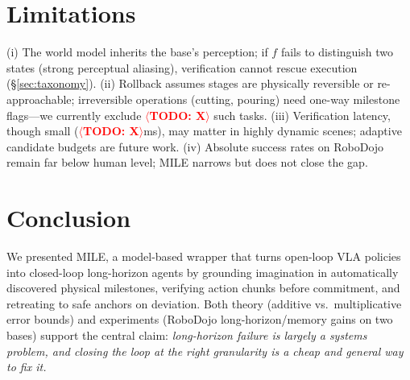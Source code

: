 \documentclass{article}
\newcommand{\mile}{\textsc{MILE}}
\newcommand{\TODO}[1]{\textcolor{red}{\textbf{$\langle$TODO: #1$\rangle$}}}
\begin{document}
\section{Limitations}
\label{sec:limits}

(i) The world model inherits the base's perception; if $f$ fails to distinguish two states (strong perceptual aliasing), verification cannot rescue execution (\S\ref{sec:taxonomy}). (ii) Rollback assumes stages are physically reversible or re-approachable; irreversible operations (cutting, pouring) need one-way milestone flags---we currently exclude \TODO{X} such tasks. (iii) Verification latency, though small (\TODO{X}ms), may matter in highly dynamic scenes; adaptive candidate budgets are future work. (iv) Absolute success rates on RoboDojo remain far below human level; \mile{} narrows but does not close the gap.

\section{Conclusion}
\label{sec:conclusion}

We presented \mile{}, a model-based wrapper that turns open-loop VLA policies into closed-loop long-horizon agents by grounding imagination in automatically discovered physical milestones, verifying action chunks before commitment, and retreating to safe anchors on deviation. Both theory (additive vs.\ multiplicative error bounds) and experiments (RoboDojo long-horizon/memory gains on two bases) support the central claim: \emph{long-horizon failure is largely a systems problem, and closing the loop at the right granularity is a cheap and general way to fix it.}
\end{document}
